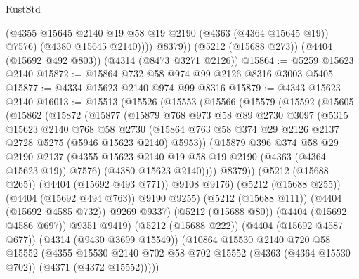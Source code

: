 \begin{lexlean}{RustStd}
\begin{coremodule}
{\begin{coremodule}
{{{{{{{{{{{{{{{{              (@4355 @15645 @2140 @19 @58 @19 @2190 (@4363 (@4364 @15645 @19)) @7576)
              (@4380 @15645 @2140))))
        @8379))
    (@5212 (@15688 @273))
    (@4404 (@15692 @492 @803))
    (@4314 (@8473 @3271 @2126))
@15864 := @5259 @15623 @2140
@15872 := @15864 @732 @58 @974 @99 @2126 @8316 @3003 @5405
@15877 := @4334 @15623 @2140 @974 @99 @8316
@15879 := @4343 @15623 @2140
@16013 := @15513
    (@15526
      (@15553
        (@15566
          (@15579
            (@15592
              (@15605
                (@15862
                  (@15872
                    (@15877
                      (@15879
                        @768
                        @973
                        @58
                        @89
                        @2730
                        @3097
                        (@5315
                          @15623
                          @2140
                          @768
                          @58
                          @2730
                          (@15864
                            @763
                            @58
                            @374
                            @29
                            @2126
                            @2137
                            @2728
                            @5275
                            (@5946 @15623 @2140)
                            @5953))
                        (@15879
                          @396
                          @374
                          @58
                          @29
                          @2190
                          @2137
                          (@4355 @15623 @2140 @19 @58 @19 @2190 (@4363 (@4364 @15623 @19)) @7576)
                          (@4380 @15623 @2140))))
                    @8379))
                (@5212 (@15688 @265))
                (@4404 (@15692 @493 @771))
                @9108
                @9176)
              (@5212 (@15688 @255))
              (@4404 (@15692 @494 @763))
              @9190
              @9255)
            (@5212 (@15688 @111))
            (@4404 (@15692 @4585 @732))
            @9269
            @9337)
          (@5212 (@15688 @80))
          (@4404 (@15692 @4586 @697))
          @9351
          @9419)
        (@5212 (@15688 @222))
        (@4404 (@15692 @4587 @677))
        (@4314 (@9430 @3699 @15549))
        (@10864
          @15530
          @2140
          @720
          @58
          @15552
          (@4355
            @15530
            @2140
            @702
            @58
            @702
            @15552
            (@4363 (@4364 @15530 @702))
            (@4371 (@4372 @15552)))))
}}}}}}}}}}}}}}}}
\end{coremodule}}
\end{coremodule}
\end{lexlean}
